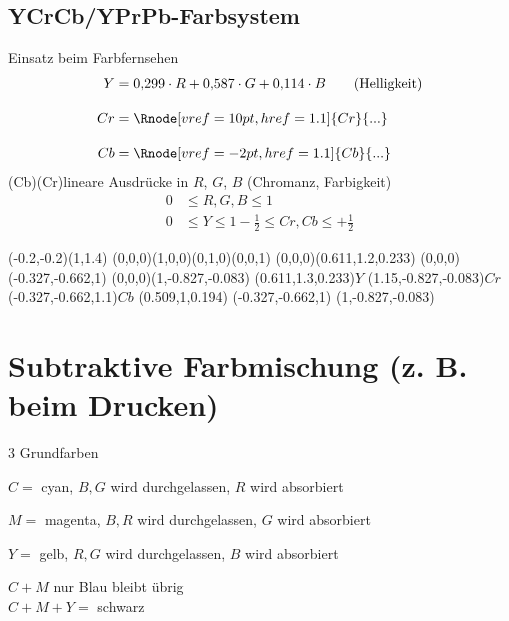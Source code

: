 \subsection{YCrCb/YPrPb-Farbsystem}
Einsatz beim Farbfernsehen
\begin{align*}
 Y &= 0{,}299 \cdot R + 0{,}587 \cdot G + 0{,}114 \cdot B \qquad \text{(Helligkeit)}\\[1em]
 Cr &= \Rnode[vref=10pt,href=1.1]{Cr}{...} \\[1em]
 Cb &= \Rnode[vref=-2pt,href=1.1]{Cb}{...}
\end{align*}
\psbrace(Cb)(Cr){lineare Ausdrücke in $R$, $G$, $B$ (Chromanz, Farbigkeit)}
\begin{align*}
 0 &\le R, G, B \le 1\\
 0 &\le Y \le 1
 -\frac{1}{2} \le Cr, Cb \le +\frac{1}{2}
\end{align*}
\begin{center}
	\begin{pspicture}(-0.2,-0.2)(1,1.4)
	\pstThreeDCoor[linecolor=black]
	\pstThreeDBox(0,0,0)(1,0,0)(0,1,0)(0,0,1)
	\pstThreeDLine{->}(0,0,0)(0.611,1.2,0.233)
	\pstThreeDLine{->}(0,0,0)(-0.327,-0.662,1)
	\pstThreeDLine{->}(0,0,0)(1,-0.827,-0.083)
	\pstThreeDPut(0.611,1.3,0.233){$Y$}
	\pstThreeDPut(1.15,-0.827,-0.083){$Cr$}
	\pstThreeDPut(-0.327,-0.662,1.1){$Cb$}
	\pstThreeDDot[drawCoor=true](0.509,1,0.194)
	\pstThreeDDot[drawCoor=true,dotstyle=none](-0.327,-0.662,1)
	\pstThreeDDot[drawCoor=true,dotstyle=none](1,-0.827,-0.083)
	\end{pspicture}
\end{center}

\section{Subtraktive Farbmischung (z. B. beim Drucken)}
3 Grundfarben
\begin{description}
 \item $C = $ cyan, $B, G$ wird durchgelassen, $R$ wird absorbiert
 \item $M = $ magenta, $B, R$ wird durchgelassen, $G$ wird absorbiert
 \item $Y = $ gelb, $R, G$ wird durchgelassen, $B$ wird absorbiert
\end{description}
$C + M$ nur Blau bleibt übrig\\
$C + M + Y = $ schwarz


